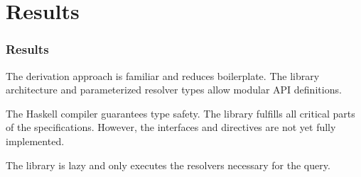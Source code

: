 \section{Results}

\begin{frame}\frametitle{Results}

\begin{itemize}
  
   The derivation approach is familiar and reduces boilerplate. The library architecture and parameterized resolver types allow modular API definitions.

   The Haskell compiler guarantees type safety. The library fulfills all critical parts of the specifications. However, the interfaces and directives are not yet fully implemented. 

   The library is lazy and only executes the resolvers necessary for the query. 

\end{itemize}
\end{frame}

